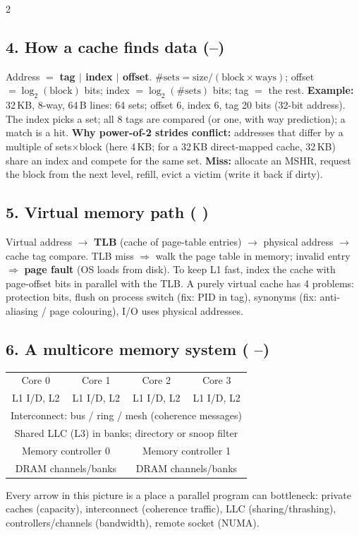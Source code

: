 \begin{multicols}{2}
\subsection*{4. How a cache finds data (--)}
Address $=$ \textbf{tag $|$ index $|$ offset}. $\#\text{sets}=\text{size}/(\text{block}\times\text{ways})$; offset $=\log_2(\text{block})$ bits; index $=\log_2(\#\text{sets})$ bits; tag $=$ the rest.
\textbf{Example:} 32\,KB, 8-way, 64\,B lines: 64 sets; offset 6, index 6, tag 20 bits (32-bit address). The index picks a set; all 8 tags are compared (or one, with way prediction); a match is a hit. \textbf{Why power-of-2 strides conflict:} addresses that differ by a multiple of sets$\times$block (here 4\,KB; for a 32\,KB direct-mapped cache, 32\,KB) share an index and compete for the same set.
\textbf{Miss:} allocate an MSHR, request the block from the next level, refill, evict a victim (write it back if dirty).

\subsection*{5. Virtual memory path ( )}
Virtual address $\rightarrow$ \textbf{TLB} (cache of page-table entries) $\rightarrow$ physical address $\rightarrow$ cache tag compare. TLB miss $\Rightarrow$ walk the page table in memory; invalid entry $\Rightarrow$ \textbf{page fault} (OS loads from disk). To keep L1 fast, index the cache with page-offset bits in parallel with the TLB. A purely virtual cache has 4 problems: protection bits, flush on process switch (fix: PID in tag), synonyms (fix: anti-aliasing / page colouring), I/O uses physical addresses.

\columnbreak
\subsection*{6. A multicore memory system (  --)}
\begin{center}\small{}
\begin{tabular}{|c|c|c|c|}
\hline
Core 0 & Core 1 & Core 2 & Core 3\\
L1 I/D, L2 & L1 I/D, L2 & L1 I/D, L2 & L1 I/D, L2\\
\hline
\multicolumn{4}{|c|}{Interconnect: bus / ring / mesh (coherence messages)}\\
\hline
\multicolumn{4}{|c|}{Shared LLC (L3) in banks; directory or snoop filter}\\
\hline
\multicolumn{2}{|c|}{Memory controller 0} & \multicolumn{2}{c|}{Memory controller 1}\\
\multicolumn{2}{|c|}{DRAM channels/banks} & \multicolumn{2}{c|}{DRAM channels/banks}\\
\hline
\end{tabular}
\end{center}
Every arrow in this picture is a place a parallel program can bottleneck: private caches (capacity), interconnect (coherence traffic), LLC (sharing/thrashing), controllers/channels (bandwidth), remote socket (NUMA).


\end{multicols}
